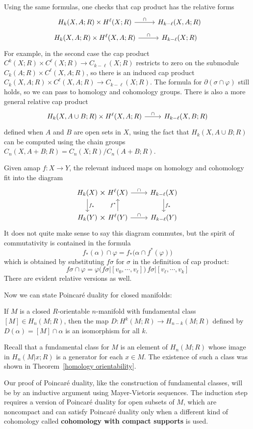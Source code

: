 Using the same formulas, one checks that cap product has the relative forms
\[\begin{tikzcd}[row sep=tiny]
H_k(X,A;R)\times H^\ell(X;R)\ar[r,"\cap"]&H_{k-\ell}(X,A;R)\\
H_k(X,A;R)\times H^\ell(X,A;R)\ar[r,"\cap"]&H_{k-\ell}(X;R)
\end{tikzcd}\]
For example, in the second case the cap product $C^k(X;R)\times C^\ell(X;R)\to C_{k-\ell}(X;R)$ restricts to zero on the submodule $C_k(A;R)\times C^\ell(X,A;R)$, so there is an induced cap product $C_k(X,A;R)\times C^\ell(X,A;R)\to C_{k-\ell}(X;R)$. The formula for $\partial(\sigma\cap\varphi)$ still holds, so we can pass to homology and cohomology groups. There is also a more general relative cap product
\[\begin{tikzcd}
H_k(X,A\cup B;R)\times H^\ell(X,A;R)\ar[r,"\cap"]&H_{k-\ell}(X,B;R)
\end{tikzcd}\]
defined when $A$ and $B$ are open sets in $X$, using the fact that $H_k(X,A\cup B;R)$ can be computed using the chain groups $C_n(X,A+B;R)=C_n(X;R)/C_n(A+B;R)$.\par
Given amap $f:X\to Y$, the relevant induced maps on homology and cohomology fit into the diagram
\[\begin{tikzcd}[column sep=tiny]
H_k(X)\ar[draw=none]{r}[name=X, anchor=center,scale=1.5]{\times}\ar[d,"f_*"]&H^\ell(X)\ar[rrrr,"\cap"]&&&&H_{k-\ell}(X)\ar[d,"f_*"]\\
H_k(Y)\ar[draw=none]{r}[name=Y, anchor=center,scale=1.5]{\times}&H^\ell(Y)\ar[u,"f^*"]\ar[rrrr,"\cap"]&&&&H_{k-\ell}(Y)
\end{tikzcd}\]
It does not quite make sense to say this diagram commutes, but the spirit of
commutativity is contained in the formula
\[f_*(\alpha)\cap\varphi=f_*\big(\alpha\cap f^*(\varphi)\big)\]
which is obtained by substituting $f\sigma$ for $\sigma$ in the definition of cap product: 
\[f\sigma\cap\varphi=\varphi(f\sigma|[v_0,\cdots,v_\ell])\,f\sigma|[v_\ell,\cdots,v_k]\]
There are evident relative versions as well.\par
Now we can state Poincar\'e duality for closed manifolds:
\begin{theorem}
If $M$ is a closed $R$-orientable $n$-manifold with fundamental class $[M]\in H_n(M;R)$, then the map $D:H^k(M;R)\to H_{n-k}(M;R)$ defined by $D(\alpha)=[M]\cap\alpha$ is an isomorphism for all $k$.
\end{theorem}
Recall that a fundamental class for $M$ is an element of $H_n(M;R)$ whose image in $H_n(M|x;R)$ is a generator for each $x\in M$. The existence of such a class was shown in Theorem~\ref{homology orientability}.\par
Our proof of Poincar\'e duality, like the construction of fundamental classes, will be by an inductive argument using Mayer-Vietoris sequences. The induction step requires a version of Poincar\'e duality for open subsets of $M$, which are noncompact and can satisfy Poincar\'e duality only when a different kind of cohomology called \textbf{cohomology with compact supports} is used.

